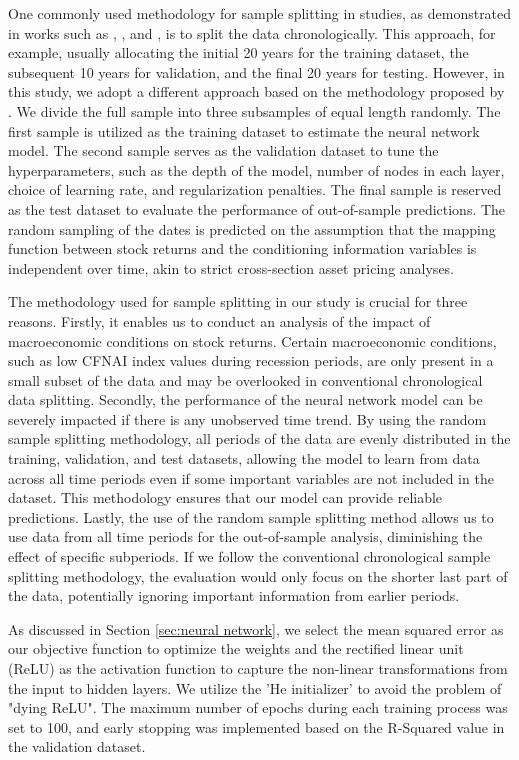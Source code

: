 One commonly used methodology for sample splitting in studies, as demonstrated in works such as \citet*{kozak2020shrinking}, \citet*{gu2020empirical}, and \citet*{chen2019deep}, is to split the data chronologically. This approach, for example, usually allocating the initial 20 years for the training dataset, the subsequent 10 years for validation, and the final 20 years for testing. However, in this study, we adopt a different approach based on the methodology proposed by \citet*{kaniel2022machine}. We divide the full sample into three subsamples of equal length randomly. The first sample is utilized as the training dataset to estimate the neural network model. The second sample serves as the validation dataset to tune the hyperparameters, such as the depth of the model, number of nodes in each layer, choice of learning rate, and regularization penalties. The final sample is reserved as the test dataset to evaluate the performance of out-of-sample predictions. The random sampling of the dates is predicted  on the assumption that the mapping function between stock returns and the conditioning information variables is independent over time, akin to strict cross-section asset pricing analyses.

The methodology used for sample splitting in our study is crucial for three reasons. Firstly, it enables us to conduct an analysis of the impact of macroeconomic conditions on stock returns. Certain macroeconomic conditions, such as low CFNAI index values during recession periods, are only present in a small subset of the data and may be overlooked in conventional chronological data splitting. Secondly, the performance of the neural network model can be severely impacted if there is any unobserved time trend. By using the random sample splitting methodology, all periods of the data are evenly distributed in the training, validation, and test datasets, allowing the model to learn from data across all time periods even if some important variables are not included in the dataset. This methodology ensures that our model can provide reliable predictions. Lastly, the use of the random sample splitting method allows us to use data from all time periods for the out-of-sample analysis, diminishing the effect of specific subperiods. If we follow the conventional chronological sample splitting methodology, the evaluation would only focus on the shorter last part of the data, potentially ignoring important information from earlier periods.

As discussed in Section \ref{sec:neural network}, we select the mean squared error as our objective function to optimize the weights and the rectified linear unit (ReLU) as the activation function to capture the non-linear transformations from the input to hidden layers. We utilize the 'He initializer' to avoid the problem of "dying ReLU". The maximum number of epochs during each training process was set to 100, and early stopping was implemented based on the R-Squared value in the validation dataset.

